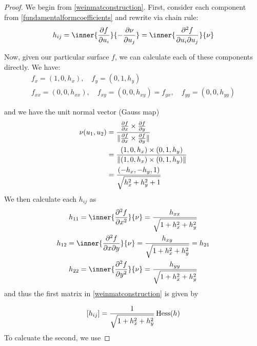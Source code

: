        	\begin{proof}
       		We begin from \cref{weinmatconstruction}.
       		First, consider each component from \cref{fundamentalformcoefficients}
       		and rewrite via chain rule:
      		 \[ h_{ij} = \inner{\frac{\partial f}{\partial u_i}}{-\frac{\partial \nu}{\partial u_j}}
       		= \inner{\frac{\partial^2 f}{\partial u_i \partial u_j}}{\nu} \]
       		
       		Now, given our particular surface $f$, we can calculate each of these components directly. We have:
       		\begin{equation}
       		\begin{gathered}
       		f_{x} = (1, 0, h_x) , \quad
       		f_{y} = (0, 1, h_y)  \\
       		f_{xx} = (0, 0, h_{xx}) , \quad
       		f_{xy} = (0, 0, h_{xy}) = f_{yx} , \quad
       		f_{yy} = (0, 0, h_{yy})
       		\end{gathered}
       		\end{equation}
       		
       		\noindent and we have the unit normal vector (Gauss map)
       		\begin{align}
       		\nu(u_1, u_2) &=
       		\frac{\frac{\partial f}{\partial x} \times \frac{\partial f}{\partial y}}
       		{\Vert\frac{\partial f}{\partial x} \times \frac{\partial f}{\partial y}\Vert} \\
       		&= \frac{(1, 0, h_x) \times (0, 1, h_y)}{\Vert(1, 0, h_x) \times (0, 1, h_y)\Vert} \\
       		&= \frac{\left( -h_x , -h_y , 1 \right)}{\sqrt{h_x^2 + h_y^2 + 1}}
	 \end{align}
	 We then calculate each $h_{ij}$ as
	 \begin{equation}
	 \begin{gathered}
	 h_{11} = \inner{\frac{\partial^2 f}{\partial x^2}}{\nu} = 
		 \frac{h_{xx}}{\sqrt{1+h_x^2 + h_y^2}} \\
	  h_{12} = \inner{\frac{\partial^2 f}{\partial x \partial y}}{\nu} = 
	  \frac{h_{xy}}{\sqrt{1+h_x^2 + h_y^2}} = h_{21} \\
	  h_{22} = \inner{\frac{\partial^2 f}{\partial y^2}}{\nu} = 
	  \frac{h_{yy}}{\sqrt{1+h_x^2 + h_y^2}} \\
	 \end{gathered}
	 \end{equation}
	 and thus the first matrix in \cref{weinmatconstruction} is given by
	 
	 \begin{equation} \label{hij_exactgraph}
	 [h_{ij}] = \frac{1}{\sqrt{1+h_x^2 + h_y^2}} \,  \mathrm{Hess} (h)
	 \end{equation}
	 To calcuate the second, we use
	 

\end{proof}
